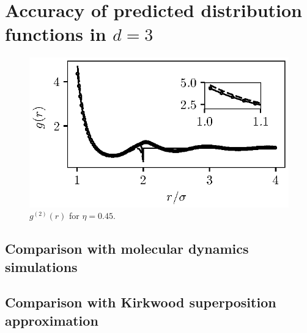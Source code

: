 \documentclass[11pt]{report}
\def\includebibliography{}
\begin{document}

\section{Accuracy of predicted distribution functions in $d = 3$}

\begin{figure}
 \includegraphics[width=\linewidth]{g2_phi045}
 \caption{$g^{(2)}(r)$ for $\eta = 0.45$.}
\end{figure}

\subsection{Comparison with molecular dynamics simulations}
\subsection{Comparison with Kirkwood superposition approximation}

\ifdefined\includebibliography
  \printbibliography
\fi
\end{document}
